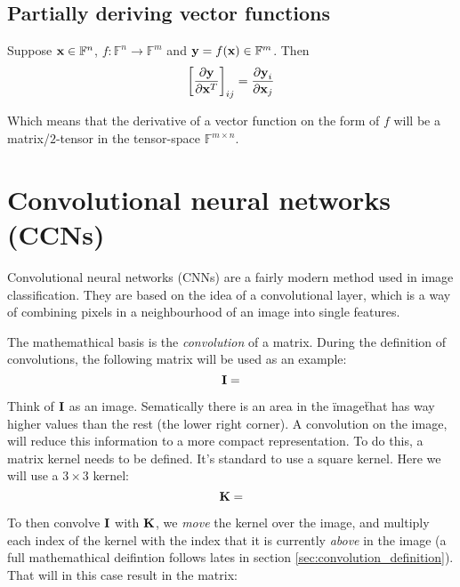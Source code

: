 \subsection{Partially deriving vector functions}
Suppose $\textbf{x} \in \mathbb{F}^n$, 
$f: \mathbb{F}^n \rightarrow \mathbb{F}^m$ and
$\textbf{y} = f(\textbf{x}) \in \mathbb{F}^m$.
Then
\begin{equation}
    \left[ \frac{\partial \textbf{y}}{\partial \textbf{x}^T} \right]_{ij} =
    \frac{\partial \textbf{y}_i}{\partial \textbf{x}_j}
\end{equation}

Which means that the derivative of a vector function on the form of $f$ will be a matrix/$2$-tensor
in the tensor-space $\mathbb{F}^{m\times n}$.


\section{Convolutional neural networks (CCNs)} \label{sec:convolutional_neural_networks}
Convolutional neural networks (CNNs) are a fairly modern method used in image classification.
They are based on the idea of a convolutional layer, which is a way of combining pixels in a
neighbourhood of an image into single features.

The mathemathical basis is the \textit{convolution} of a matrix.
During the definition of convolutions, the following matrix will be used as an example:
\begin{equation}
    \textbf{I} = 
\end{equation}

Think of $\textbf{I}$ as an image.
Sematically there is an area in the \"image\" that has way higher values than the rest
(the lower right corner).
A convolution on the image, will reduce this information to a more compact representation.
To do this, a matrix kernel needs to be defined. It's standard to use a square kernel.
Here we will use a $3 \times 3$ kernel:
\begin{equation}
    \matsym{K} = 
        
\end{equation}

To then convolve $\textbf{I}$ with $\textbf{K}$, we \textit{move} the kernel over the image,
and multiply each index of the kernel with the index that it is currently \textit{above} in the image
(a full mathemathical deifintion follows lates in section \ref{sec:convolution_definition}).
That will in this case result in the matrix:
\begin{equation}
    
\end{equation}


